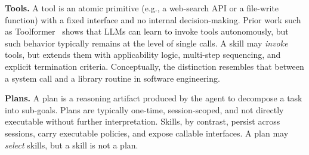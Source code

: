 \documentclass[conference, compsoc]{IEEEtran}
\theoremstyle{plain}
\newcommand{\para}[1]{\smallskip\noindent\textbf{#1.}}
\begin{document}
\begin{table}[t]
\centering
\caption{Concept unification: agentic skills versus related abstractions in LLM agent systems.}
\label{tab:concept_unification}
\end{table}

\para{Tools}
A tool is an atomic primitive (e.g., a web-search API or a file-write function) with a fixed interface and no internal decision-making. Prior work such as Toolformer~\cite{schick2024toolformer} shows that LLMs can learn to invoke tools autonomously, but such behavior typically remains at the level of single calls. A skill may \emph{invoke} tools, but extends them with applicability logic, multi-step sequencing, and explicit termination criteria. Conceptually, the distinction resembles that between a system call and a library routine in software engineering.

\para{Plans} A plan is a reasoning artifact produced by the agent to decompose a task into sub-goals. Plans are typically one-time, session-scoped, and not directly executable without further interpretation. Skills, by contrast, persist across sessions, carry executable policies, and expose callable interfaces. A plan may \emph{select} skills, but a skill is not a plan.
\end{document}
